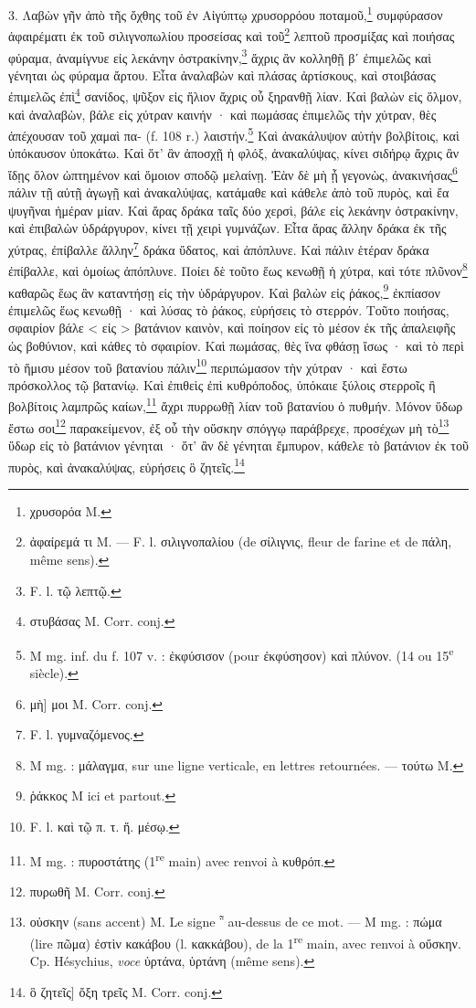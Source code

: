 \documentclass[landscape, a4paper, 11pt, oneside, polutonikogreek, french]{article}
\begin{document}
3. Λαβὼν γῆν ἀπὸ τῆς ὄχθης τοῦ ἐν Αἰγύπτῳ χρυσορρόου ποταμοῦ,\footnote{χρυσορόα M.} συμφύρασον ἀφαιρέματι ἐκ τοῦ σιλιγνοπωλίου προσείσας καὶ τοῦ\footnote{ἀφαίρεμά τι M. --- F. l. σιλιγνοπαλίου (de σίλιγνις, fleur de farine et de πάλη, même sens).} λεπτοῦ προσμίξας καὶ ποιήσας φύραμα, ἀναμίγνυε εἰς λεκάνην ὀστρακίνην,\footnote{F. l. τῷ λεπτῷ.} ἄχρις ἂν κολληθῇ βʹ ἐπιμελῶς καὶ γένηται ὡς φύραμα ἄρτου. Εἶτα ἀναλαβὼν καὶ πλάσας ἀρτίσκους, καὶ στοιβάσας ἐπιμελῶς ἐπὶ\footnote{στυβάσας M. Corr. conj.} σανίδος, ψῦξον εἰς ἥλιον ἄχρις οὗ ξηρανθῇ λίαν. Καὶ βαλὼν εἰς ὅλμον, καὶ ἀναλαβὼν, βάλε εἰς χύτραν καινήν · καὶ πωμάσας ἐπιμελῶς τὴν χύτραν, θὲς ἀπέχουσαν τοῦ χαμαὶ πα- (f. 108 r.) λαιστήν.\footnote{M mg. inf. du f. 107 v. : ἐκφύσισον (pour ἐκφύσησον) καὶ πλύνον. (14 ou 15\textsuperscript{e} siècle).} Καὶ ἀνακάλυψον αὐτὴν βολβίτοις, καὶ ὑπόκαυσον ὑποκάτω. Καὶ ὅτ' ἂν ἀποσχῇ ἡ φλόξ, ἀνακαλύψας, κίνει σιδήρῳ ἄχρις ἂν ἴδῃς ὅλον ὠπτημένον καὶ ὅμοιον σποδῷ μελαίνῃ. Ἐὰν δὲ μὴ ᾖ γεγονὼς, ἀνακινήσας\footnote{μὴ] μοι M. Corr. conj.} πάλιν τῇ αὐτῇ ἀγωγῇ καὶ ἀνακαλύψας, κατάμαθε καὶ κάθελε ἀπὸ τοῦ πυρὸς, καὶ ἔα ψυγῆναι ἡμέραν μίαν. Καὶ ἄρας δράκα ταῖς δύο χερσὶ, βάλε εἰς λεκάνην ὀστρακίνην, καὶ ἐπιβαλὼν ὑδράργυρον, κίνει τῇ χειρὶ γυμνάζων. Εἶτα ἄρας ἄλλην δράκα ἐκ τῆς χύτρας, ἐπίβαλλε ἄλλην\footnote{F. l. γυμναζόμενος.} δράκα ὕδατος, καὶ ἀπόπλυνε. Καὶ πάλιν ἑτέραν δράκα ἐπίβαλλε, καὶ ὁμοίως ἀπόπλυνε. Ποίει δὲ τοῦτο ἕως κενωθῇ ἡ χύτρα, καὶ τότε πλῦνον\footnote{M mg. : μάλαγμα, sur une ligne verticale, en lettres retournées. --- τούτω M.} καθαρῶς ἕως ἂν καταντήσῃ εἰς τὴν ὑδράργυρον. Καὶ βαλὼν εἰς ῥάκος,\footnote{ῥάκκος M ici et partout.} ἐκπίασον ἐπιμελῶς ἕως κενωθῇ · καὶ λύσας τὸ ῥάκος, εὑρήσεις τὸ στερρόν. Τοῦτο ποιήσας, σφαιρίον βάλε < εἰς > βατάνιον καινὸν, καὶ ποίησον εἰς τὸ μέσον ἐκ τῆς ἀπαλειφῆς ὡς βοθύνιον, καὶ κάθες τὸ σφαιρίον. Καὶ πωμάσας, θὲς ἵνα φθάσῃ ἴσως · καὶ τὸ περὶ τὸ ἥμισυ μέσον τοῦ βατανίου πάλιν\footnote{F. l. καὶ τῷ π. τ. ἥ. μέσῳ.} περιπώμασον τὴν χύτραν · καὶ ἔστω πρόσκολλος τῷ βατανίῳ. Καὶ ἐπιθεὶς ἐπὶ κυθρόποδος, ὑπόκαιε ξύλοις στερροῖς ἢ βολβίτοις λαμπρῶς καίων,\footnote{M mg. : πυροστάτης (1\textsuperscript{re} main) avec renvoi à κυθρόπ.} ἄχρι πυρρωθῇ λίαν τοῦ βατανίου ὁ πυθμήν. Μόνον ὕδωρ ἔστω σοι\footnote{πυρωθῆ M. Corr. conj.} παρακείμενον, ἐξ οὗ τὴν οὕσκην σπόγγῳ παράβρεχε, προσέχων μὴ τὸ\footnote{οὐσκην (sans accent) M. Le signe ῁ au-dessus de ce mot. --- M mg. : πώμα (lire πῶμα) ἐστὶν κακάβου (l. κακκάβου), de la 1\textsuperscript{re} main, avec renvoi à οὔσκην. Cp. Hésychius, \emph{voce} ὑρτάνα, ὑρτάνη (même sens).} ὕδωρ εἰς τὸ βατάνιον γένηται · ὅτ' ἂν δὲ γένηται ἔμπυρον, κάθελε τὸ βατάνιον ἐκ τοῦ πυρὸς, καὶ ἀνακαλύψας, εὑρήσεις ὃ ζητεῖς.\footnote{ὃ ζητεῖς] ὄξη τρεῖς M. Corr. conj.}
\end{document}
